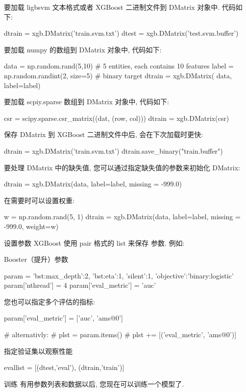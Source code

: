 \documentclass{article}
\newenvironment{python}{\VerbatimEnvironment\begin{pythoncode}}{\end{pythoncode}}
\begin{document}
要加载 ligbsvm 文本格式或者 XGBoost 二进制文件到 DMatrix 对象中. 代码如下:
\begin{python}
dtrain = xgb.DMatrix('train.svm.txt')
dtest = xgb.DMatrix('test.svm.buffer')
\end{python}

要加载 numpy 的数组到 DMatrix 对象中, 代码如下:
\begin{python}
data = np.random.rand(5,10) # 5 entities, each contains 10 features
label = np.random.randint(2, size=5) # binary target
dtrain = xgb.DMatrix( data, label=label)
\end{python}
要加载 scpiy.sparse 数组到 DMatrix 对象中, 代码如下:
\begin{python}
csr = scipy.sparse.csr_matrix((dat, (row, col)))
dtrain = xgb.DMatrix(csr)
\end{python}
保存 DMatrix 到 XGBoost 二进制文件中后, 会在下次加载时更快:
\begin{python}
dtrain = xgb.DMatrix('train.svm.txt')
dtrain.save_binary("train.buffer")
\end{python}
要处理 DMatrix 中的缺失值, 您可以通过指定缺失值的参数来初始化 DMatrix:
\begin{python}
dtrain = xgb.DMatrix(data, label=label, missing = -999.0)
\end{python}
在需要时可以设置权重:
\begin{python}
w = np.random.rand(5, 1)
dtrain = xgb.DMatrix(data, label=label, missing = -999.0, weight=w)
\end{python}
设置参数
XGBoost 使用 pair 格式的 list 来保存 参数. 例如:

Booster（提升）参数
\begin{python}
param = {'bst:max_depth':2, 'bst:eta':1, 'silent':1, 'objective':'binary:logistic' }
param['nthread'] = 4
param['eval_metric'] = 'auc'
\end{python}
您也可以指定多个评估的指标:
\begin{python}
param['eval_metric'] = ['auc', 'ams@0'] 

# alternativly:
# plst = param.items()
# plst += [('eval_metric', 'ams@0')]
\end{python}
指定验证集以观察性能
\begin{python}
evallist  = [(dtest,'eval'), (dtrain,'train')]
\end{python}
训练
有用参数列表和数据以后, 您现在可以训练一个模型了.
\end{document}
